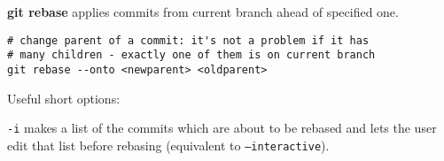 %

\textbf{git rebase} applies commits from current branch ahead of specified one.

\begin{verbatim}
# change parent of a commit: it's not a problem if it has
# many children - exactly one of them is on current branch
git rebase --onto <newparent> <oldparent>
\end{verbatim}

Useful short options:
\begin{compactenum}
\item [\texttt{-i}] makes a list of the commits which are about to be rebased and lets the user edit that list before rebasing (equivalent to \texttt{--interactive}).
\end{compactenum}

%